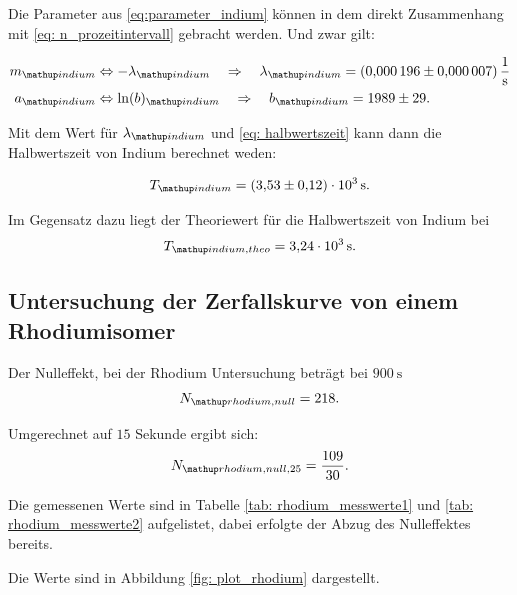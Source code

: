 Die Parameter aus \eqref{eq:parameter_indium} können in dem direkt Zusammenhang mit
\eqref{eq: n_prozeitintervall} gebracht werden. Und zwar gilt:

\begin{align}
  \label{eq:parameter_indium_vergleich}
  \begin{aligned}
    m\ua{indium}&\Leftrightarrow -\lambda\ua{indium} \quad \Rightarrow \quad \lambda\ua{indium}=\SI{0.000196\pm0.000007}{\per\second}\\
    a\ua{indium}&\Leftrightarrow \ln(b)\ua{indium} \quad \Rightarrow \quad b\ua{indium} =1989\pm 29.
  \end{aligned}
\end{align}

Mit dem Wert für $\lambda\ua{indium}$ und \eqref{eq: halbwertszeit} kann dann die Halbwertszeit von Indium
berechnet weden:

\begin{equation}
  \label{eq:halbwertzeit_indium}
  T\ua{indium}=\SI{3.53\pm0.12 e+3}{\second}.
\end{equation}

Im Gegensatz dazu liegt der Theoriewert für die Halbwertszeit von Indium\cite{indium_halb} bei
\begin{equation}
  \label{eq:halbwertzeit_indium_theo}
  T\ua{indium,theo}=\SI{3.24 e+3}{\second}.
\end{equation}

\subsection{Untersuchung der Zerfallskurve von einem Rhodiumisomer}

Der Nulleffekt, bei der Rhodium Untersuchung beträgt bei $\SI{900}{\second}$
\begin{equation*}
  N\ua{rhodium,null}=218.
\end{equation*}

Umgerechnet auf $15$ Sekunde ergibt sich: %
\begin{equation*}
     N\ua{rhodium,null,25}=\frac{109}{30}.
\end{equation*}

Die gemessenen Werte sind in Tabelle \ref{tab: rhodium_messwerte1} und \ref{tab: rhodium_messwerte2} aufgelistet, dabei erfolgte %
der Abzug des Nulleffektes bereits.


Die Werte sind in Abbildung \ref{fig: plot_rhodium} dargestellt.

